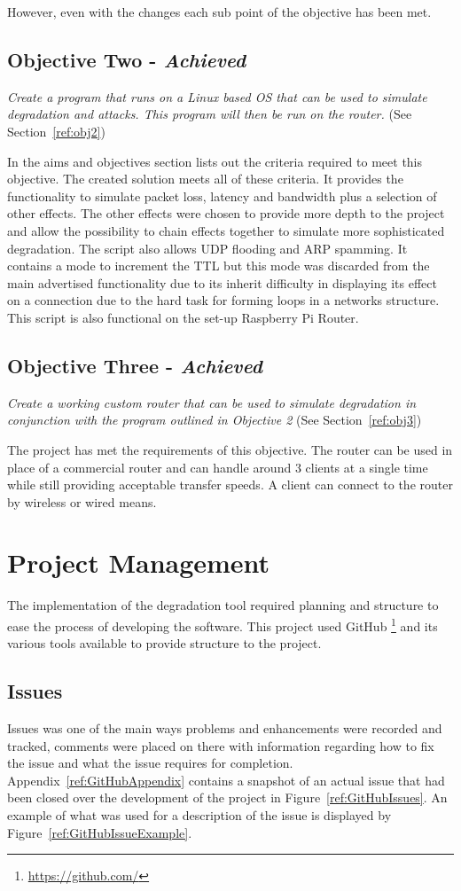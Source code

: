 However, even with the changes each sub point of the objective has been met.

\subsection{Objective Two - {\it Achieved}}
{\it Create a program that runs on a Linux based OS that can be used to simulate degradation and attacks. This program will then be run on the router.} (See Section~\ref{ref:obj2})

In the aims and objectives section lists out the criteria required to meet this objective. The created solution meets all of these criteria. It provides the functionality to simulate packet loss, latency and bandwidth plus a selection of other effects. The other effects were chosen to provide more depth to the project and allow the possibility to chain effects together to simulate more sophisticated degradation. The script also allows UDP flooding and ARP spamming. It contains a mode to increment the TTL but this mode was discarded from the main advertised functionality due to its inherit difficulty in displaying its effect on a connection due to the hard task for forming loops in a networks structure. This script is also functional on the set-up Raspberry Pi Router.


\subsection{Objective Three - {\it Achieved}}
{\it Create a working custom router that can be used to simulate degradation in conjunction with the program outlined in Objective 2} (See Section~\ref{ref:obj3})

The project has met the requirements of this objective. The router can be used in place of a commercial router and can handle around 3 clients at a single time while still providing acceptable transfer speeds. A client can connect to the router by wireless or wired means.

\section{Project Management}
The implementation of the degradation tool required planning and structure to ease the process of developing the software. This project used GitHub \footnote{\url{https://github.com/}} and its various tools available to provide structure to the project.

\subsection{Issues}
Issues was one of the main ways problems and enhancements were recorded and tracked, comments were placed on there with information regarding how to fix the issue and what the issue requires for completion. Appendix~\ref{ref:GitHubAppendix} contains a snapshot of an actual issue that had been closed over the development of the project in Figure~\ref{ref:GitHubIssues}. An example of what was used for a description of the issue is displayed by Figure~\ref{ref:GitHubIssueExample}.

